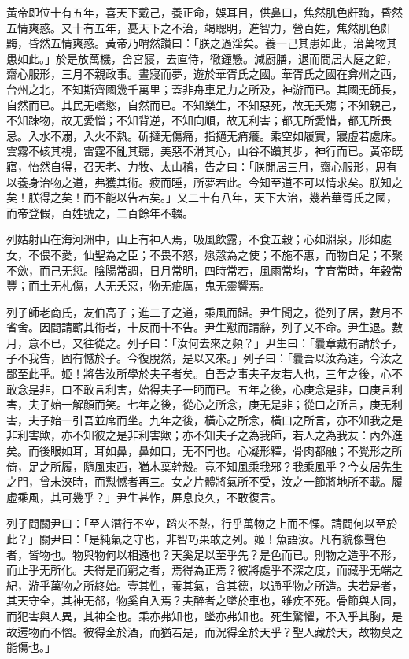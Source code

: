 
\begin{pinyinscope}
黃帝即位十有五年，喜天下戴己，養正命，娛耳目，供鼻口，焦然肌色皯黣，昏然五情爽惑。又十有五年，憂天下之不治，竭聰明，進智力，營百姓，焦然肌色皯黣，昏然五情爽惑。黃帝乃喟然讚曰：「朕之過淫矣。養一己其患如此，治萬物其患如此。」於是放萬機，舍宮寢，去直侍，徹鐘懸。減廚膳，退而間居大庭之館，齋心服形，三月不親政事。晝寢而夢，遊於華胥氏之國。華胥氏之國在弇州之西，台州之北，不知斯齊國幾千萬里；蓋非舟車足力之所及，神游而已。其國无師長，自然而已。其民无嗜慾，自然而已。不知樂生，不知惡死，故无夭殤；不知親己，不知踈物，故无愛憎；不知背逆，不知向順，故无利害；都无所愛惜，都无所畏忌。入水不溺，入火不熱。斫撻无傷痛，指擿无痟癢。乘空如履實，寢虛若處床。雲霧不硋其視，雷霆不亂其聽，美惡不滑其心，山谷不躓其步，神行而已。黃帝既寤，怡然自得，召天老、力牧、太山稽，告之曰：「朕閒居三月，齋心服形，思有以養身治物之道，弗獲其術。疲而睡，所夢若此。今知至道不可以情求矣。朕知之矣！朕得之矣！而不能以告若矣。」又二十有八年，天下大治，幾若華胥氏之國，而帝登假，百姓號之，二百餘年不輟。

列姑射山在海河洲中，山上有神人焉，吸風飲露，不食五穀；心如淵泉，形如處女，不偎不愛，仙聖為之臣；不畏不怒，愿愨為之使；不施不惠，而物自足；不聚不歛，而己无愆。陰陽常調，日月常明，四時常若，風雨常均，字育常時，年穀常豐；而土无札傷，人无夭惡，物无疵厲，鬼无靈響焉。

列子師老商氏，友伯高子；進二子之道，乘風而歸。尹生聞之，從列子居，數月不省舍。因間請蘄其術者，十反而十不告。尹生懟而請辭，列子又不命。尹生退。數月，意不已，又往從之。列子曰：「汝何去來之頻？」尹生曰：「曩章戴有請於子，子不我告，固有憾於子。今復脫然，是以又來。」列子曰：「曩吾以汝為達，今汝之鄙至此乎。姬！將告汝所學於夫子者矣。自吾之事夫子友若人也，三年之後，心不敢念是非，口不敢言利害，始得夫子一眄而已。五年之後，心庚念是非，口庚言利害，夫子始一解顏而笑。七年之後，從心之所念，庚无是非；從口之所言，庚无利害，夫子始一引吾並席而坐。九年之後，橫心之所念，橫口之所言，亦不知我之是非利害歟，亦不知彼之是非利害歟；亦不知夫子之為我師，若人之為我友：內外進矣。而後眼如耳，耳如鼻，鼻如口，无不同也。心凝形釋，骨肉都融；不覺形之所倚，足之所履，隨風東西，猶木葉幹殼。竟不知風乘我邪？我乘風乎？今女居先生之門，曾未浹時，而懟憾者再三。女之片體將氣所不受，汝之一節將地所不載。履虛乘風，其可幾乎？」尹生甚怍，屏息良久，不敢復言。

列子問關尹曰：「至人潛行不空，蹈火不熱，行乎萬物之上而不慄。請問何以至於此？」關尹曰：「是純氣之守也，非智巧果敢之列。姬！魚語汝。凡有貌像聲色者，皆物也。物與物何以相遠也？天奚足以至乎先？是色而已。則物之造乎不形，而止乎无所化。夫得是而窮之者，焉得為正焉？彼將處乎不深之度，而藏乎无端之紀，游乎萬物之所終始。壹其性，養其氣，含其德，以通乎物之所造。夫若是者，其天守全，其神无郤，物奚自入焉？夫醉者之墜於車也，雖疾不死。骨節與人同，而犯害與人異，其神全也。乘亦弗知也，墜亦弗知也。死生驚懼，不入乎其胸，是故遌物而不慴。彼得全於酒，而猶若是，而況得全於天乎？聖人藏於天，故物莫之能傷也。」


\end{pinyinscope}

